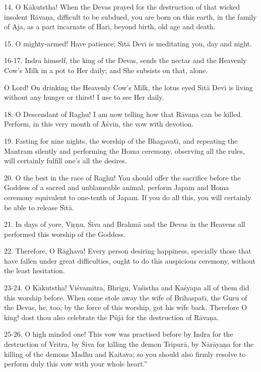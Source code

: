 14. O K\=akutstha! When the Devas prayed for the destruction of that wicked insolent R\=ava\d{n}a, difficult to be subdued, you are born on this earth, in the family of Aja, as a part incarnate of Hari, beyond birth, old age and death.

15. O mighty-armed! Have patience; S\={\i}t\=a Dev\={\i} is meditating you, day and night.

16-17. Indra himself, the king of the Devas, sends the nectar and the Heavenly Cow's Milk in a pot to Her daily; and She subsists on that, alone.

O Lord! On drinking the Heavenly Cow's Milk, the lotus eyed S\={\i}t\=a Dev\={\i} is living without any hunger or thirst! I use to see Her daily.

18. O Descendant of Raghu! I am now telling how that R\=ava\d{n}a can be killed. Perform, in this very month of \=A\'svin, the vow with devotion.

19. Fasting for nine nights, the worship of the Bhagavat\={\i}, and repeating the Mantram silently and performing the Homa ceremony, observing all the rules, will certainly fulfill one's all the desires.

20. O the best in the race of Raghu! You should offer the sacrifice before the Goddess of a sacred and unblameable animal, perform Japam and Homa ceremony equivalent to one-tenth of Japam. If you do all this, you will certainly be able to release S\={\i}t\=a.

21. In days of yore, Vi\d{s}\d{n}u, \'Siva and Brahm\=a and the Devas in the Heavens all performed this worship of the Goddess.

22. Therefore, O R\=aghava! Every person desiring happiness, specially those that have fallen under great difficulties, ought to do this auspicious ceremony, without the least hesitation.

23-24. O K\=akutstha! Vi\'svamitra, Bhrigu, Va\'sistha and Ka\'syapa all of them did this worship before. When some stole away the wife of Brihaspat\={\i}, the Guru of the Devas, he, too, by the force of this worship, got his wife back. Therefore O king! dost thou also celebrate the P\=uj\=a for the destruction of R\=ava\d{n}a.

25-26. O high minded one! This vow was practised before by Indra for the destruction of Vritra, by \'Siva for killing the demon Tripur\=a, by N\=ar\=aya\d{n}a for the killing of the demons Madhu and Kaitava; so you should also firmly resolve to perform duly this vow with your whole heart.''

